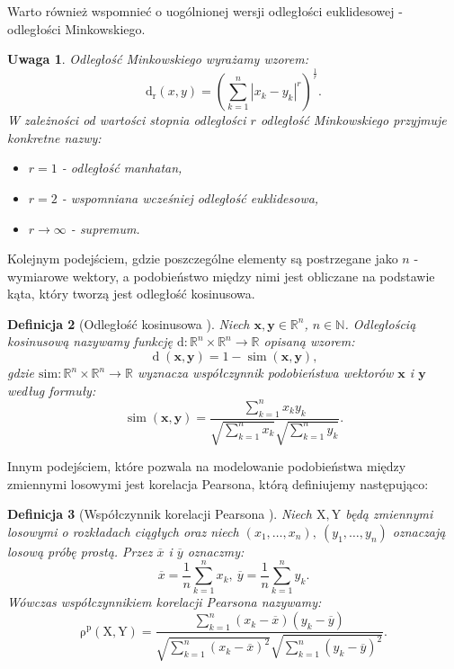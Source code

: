 \documentclass[12pt,a4paper]{report}
\newtheorem{df}{Definicja}[chapter]
\newtheorem{uwaga}[df]{Uwaga}
\newcommand{\setR}{\mathbb{R}}
\newcommand{\setN}{\mathbb{N}}
\newcommand{\rop}[2]{\operatorname{\rho^p}\left( {#1},{#2} \right)}
\newcommand{\similarity}[2]{\operatorname{sim}\left({#1}, {#2} \right)}
\newcommand{\distance}[2]{\operatorname{d}\left({#1}, {#2} \right)}
\newcommand{\distancee}[2]{\operatorname{d_r}\left({#1}, {#2} \right)}
\begin{document}
Warto również wspomnieć o uogólnionej wersji odległości euklidesowej - odległości Minkowskiego.
\begin{uwaga}
Odległość Minkowskiego wyrażamy wzorem:
$$
\distancee{x}{y} = (\sum_{k=1}^n|x_k-y_k|^r)^{\frac{1}{r}}.
$$
W zależności od wartości stopnia odległości $r$ odległość Minkowskiego przyjmuje konkretne nazwy:
\begin{itemize}
\item $r=1$ - odległość manhatan,
\item $r=2$ - wspomniana wcześniej odległość euklidesowa,
\item $r \to \infty $ - supremum. 
\end{itemize}
\end{uwaga}
Kolejnym podejściem, gdzie poszczególne elementy są postrzegane jako $n$ - wymiarowe wektory, a podobieństwo między nimi jest obliczane na podstawie kąta, który tworzą jest odległość kosinusowa.

\begin{df}[Odległość kosinusowa \citep{rsh}] %
Niech $\mathbf{x},\mathbf{y} \in \setR^n $, $n \in\setN$. Odległością kosinusową nazywamy funkcję $ \mathrm{d}: \setR^n \times \setR^n \to \setR$ opisaną wzorem:
$$
\distance{\mathbf{x}}{\mathbf{y}} = 1 - \similarity{\mathbf{x}}{\mathbf{y}},
$$ 
gdzie $\mathrm{sim}: \setR^n \times \setR^n \to \setR$ wyznacza współczynnik podobieństwa wektorów $\mathbf{x}$ i $\mathbf{y}$ według formuły:
$$
\similarity{\mathbf{x}}{\mathbf{y}} = \frac{\sum_{k=1}^n x_k y_k}{\sqrt{\sum_{k=1}^n x_k}\sqrt{\sum_{k=1}^n y_k}}.
$$
\end{df}
Innym podejściem, które pozwala na modelowanie podobieństwa między zmiennymi losowymi jest korelacja Pearsona, którą definiujemy następująco:

\begin{df}[Współczynnik korelacji Pearsona \citep{rsh}]

Niech $\mathrm{X},\mathrm{Y}$ będą zmiennymi losowymi o rozkładach ciągłych oraz niech $(x_1, \ldots, x_n), \: (y_1, \ldots, y_n)$ oznaczają losową próbę prostą. 
Przez $\overline{x}$ i $\overline{y}$ oznaczmy:
$$
\overline{x}=\frac{1}{n} \sum_{k=1}^n x_k, \: \overline{y}=\frac{1}{n} \sum_{k=1}^n y_k.
$$
Wówczas współczynnikiem korelacji Pearsona nazywamy:
$$
\rop{\mathrm{X}}{\mathrm{Y}} = \frac{\sum_{k=1}^n(x_k - \overline{x})(y_k - \overline{y})}{\sqrt{\sum_{k=1}^n(x_k - \overline{x})^2} \sqrt{\sum_{k=1}^n(y_k - \overline{y})^2 }}.
$$
\end{df}
\end{document}
